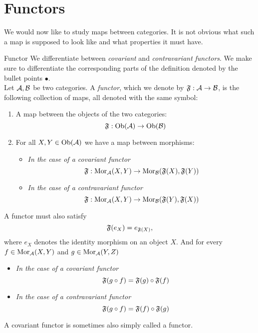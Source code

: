 \section{Functors}
We would now like to study maps between categories. 
It is not obvious what such a map is supposed to look like and what properties it must have.

\begin{definition}{Functor \cite[Sec.~1.3]{Roman2017}}{}
We differentiate between \emph{covariant} and \emph{contravariant} \emph{functors}.
We make sure to differentiate the corresponding parts of the definition denoted by the bullet points $\bullet$.\\

Let $\mathcal{A}, \mathcal{B}$ be two categories. A \emph{functor}, which we denote by $\mathfrak{F}: \mathcal{A} \to \mathcal{B}$, is the following collection of maps, all denoted with the same symbol:
\begin{enumerate}
    \item A map between the objects of the two categories:
    $$
    \mathfrak{F}: \mathrm {Ob}(\mathcal{A}) \to \mathrm {Ob}(\mathcal{B})
    $$
    \item For all $X,Y \in \mathrm {Ob}(\mathcal{A})$ we have a map between morphisms: 
    \begin{itemize}
        \item \emph{In the case of a covariant functor} $$\mathfrak{F}: \mathrm {Mor}_{\mathcal{A}}(X,Y) \to \mathrm {Mor}_{\mathcal{B}}(\mathfrak{F}(X), \mathfrak{F}(Y))$$
        \item \emph{In the case of a contravariant functor} $$\mathfrak{F}: \mathrm {Mor}_{\mathcal{A}}(X,Y) \to \mathrm {Mor}_{\mathcal{B}}(\mathfrak{F}(Y), \mathfrak{F}(X))$$
    \end{itemize}
\end{enumerate}
A functor must also satisfy
\begin{equation}
\label{eq:functor_functoriality_identity}
\mathfrak{F}(e_X) = e_{\mathfrak{F}(X)},
\end{equation}
where $e_X$ denotes the identity morphism on an object $X$. And for every $f \in \mathrm {Mor}_{\mathcal{A}}(X,Y)$ and $g \in \mathrm {Mor}_{\mathcal{A}}(Y,Z)$
\begin{itemize}
    \item \emph{In the case of a covariant functor}
    \begin{equation}
    \label{eq:functor_functoriality_covar}
    \mathfrak{F}(g \circ f) = \mathfrak{F}(g) \circ \mathfrak{F}(f)
    \end{equation}
    
    \item \emph{In the case of a contravariant functor}
    \begin{equation}
    \label{eq:functor_functoriality_contravar}
    \mathfrak{F}(g \circ f) = \mathfrak{F}(f) \circ \mathfrak{F}(g)
    \end{equation}
\end{itemize}
A covariant functor is sometimes also simply called a functor.
\end{definition}

